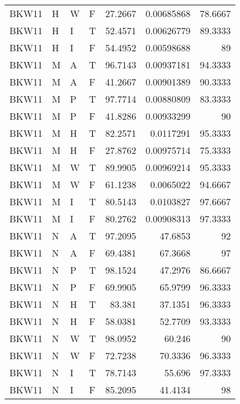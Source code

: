 \begin{table}[!htb]
{\begin{tabular}{llllrrr}
            BKW11    & H     & W     & F          & 27.2667    & 0.00685868 & 78.6667  \\
            BKW11    & H     & I     & T          & 52.4571    & 0.00626779 & 89.3333  \\
            BKW11    & H     & I     & F          & 54.4952    & 0.00598688 & 89       \\
            BKW11    & M     & A     & T          & 96.7143    & 0.00937181 & 94.3333  \\
            BKW11    & M     & A     & F          & 41.2667    & 0.00901389 & 90.3333  \\
            BKW11    & M     & P     & T          & 97.7714    & 0.00880809 & 83.3333  \\
            BKW11    & M     & P     & F          & 41.8286    & 0.00933299 & 90       \\
            BKW11    & M     & H     & T          & 82.2571    & 0.0117291  & 95.3333  \\
            BKW11    & M     & H     & F          & 27.8762    & 0.00975714 & 75.3333  \\
            BKW11    & M     & W     & T          & 89.9905    & 0.00969214 & 95.3333  \\
            BKW11    & M     & W     & F          & 61.1238    & 0.0065022  & 94.6667  \\
            BKW11    & M     & I     & T          & 80.5143    & 0.0103827  & 97.6667  \\
            BKW11    & M     & I     & F          & 80.2762    & 0.00908313 & 97.3333  \\
            BKW11    & N     & A     & T          & 97.2095    & 47.6853    & 92       \\
            BKW11    & N     & A     & F          & 69.4381    & 67.3668    & 97       \\
            BKW11    & N     & P     & T          & 98.1524    & 47.2976    & 86.6667  \\
            BKW11    & N     & P     & F          & 69.9905    & 65.9799    & 96.3333  \\
            BKW11    & N     & H     & T          & 83.381     & 37.1351    & 96.3333  \\
            BKW11    & N     & H     & F          & 58.0381    & 52.7709    & 93.3333  \\
            BKW11    & N     & W     & T          & 98.0952    & 60.246     & 90       \\
            BKW11    & N     & W     & F          & 72.7238    & 70.3336    & 96.3333  \\
            BKW11    & N     & I     & T          & 78.7143    & 55.696     & 97.3333  \\
            BKW11    & N     & I     & F          & 85.2095    & 41.4134    & 98       \\
            \hline
        \end{tabular}
    }{}
\end{table}